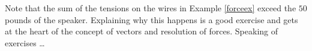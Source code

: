 \documentclass{ximera}
\begin{document}
Note that the sum of the tensions on the wires in Example \ref{forceex} exceed the $50$ pounds of the speaker.  Explaining why this happens is a good exercise and gets at the heart of the concept of vectors and resolution of forces.  Speaking of exercises \ldots



\closegraphsfile
\end{document}
